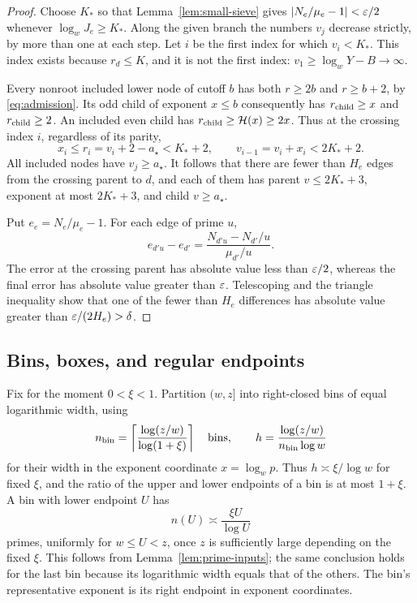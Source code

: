 \begin{proof}
Choose $K_*$ so that Lemma~\ref{lem:small-sieve} gives
$|N_e/\mu_e-1|<\varepsilon/2$ whenever $\log_w J_e\ge K_*$.  Along the
given branch the numbers $v_j$ decrease strictly, by more than one
at each step.  Let $i$ be the first index for which $v_i<K_*$.
This index exists because $r_d\le K$, and it is not the first index:
$v_1\ge\log_wY-B\to\infty$.

Every nonroot included lower node of cutoff $b$ has both $r\ge2b$
and $r\ge b+2$, by \eqref{eq:admission}.  Its odd child of exponent
$x\le b$ consequently has $r_{\rm child}\ge x$ and
$r_{\rm child}\ge2$.  An included even child has
$r_{\rm child}\ge \mathcal H(x)\ge2x$.  Thus at the crossing index $i$,
regardless of its parity,
\[
 x_i\le r_i=v_i+2-a_\star<K_*+2,
 \qquad v_{i-1}=v_i+x_i<2K_*+2.
\]
All included nodes have $v_j\ge a_\star$.  It follows that there are
fewer than $H_e$ edges from the crossing parent to $d$, and each of
them has parent $v\le2K_*+3$, exponent at most $2K_*+3$, and child
$v\ge a_\star$.

Put $e_e=N_e/\mu_e-1$.  For each edge of prime $u$,
\[
 e_{d'u}-e_{d'}
   =\frac{N_{d'u}-N_{d'}/u}{\mu_{d'}/u}.
\]
The error at the crossing parent has absolute value less than
$\varepsilon/2$, whereas the final error has absolute value greater than
$\varepsilon$.  Telescoping and the triangle inequality show that one of
the fewer than $H_e$ differences has absolute value greater than
$\varepsilon/(2H_e)>\delta$.
\end{proof}

\subsection{Bins, boxes, and regular endpoints}

Fix for the moment $0<\xi<1$.  Partition $(w,z]$ into right-closed
bins of equal logarithmic width, using
\[
 n_{\rm bin}=\left\lceil\frac{\log(z/w)}{\log(1+\xi)}\right\rceil
 \quad\text{bins},\qquad
 h=\frac{\log(z/w)}{n_{\rm bin}\log w}
\]
for their width in the exponent coordinate $x=\log_w p$.
Thus $h\asymp\xi/\log w$ for fixed $\xi$, and the ratio of the upper
and lower endpoints of a bin is at most $1+\xi$.  A bin with lower
endpoint $U$ has
\begin{equation}\label{eq:boxes-bin-count}
 n(U)\asymp\frac{\xi U}{\log U}
\end{equation}
primes, uniformly for $w\le U<z$, once $z$ is sufficiently large
depending on the fixed $\xi$.  This follows from
Lemma~\ref{lem:prime-inputs}; the same conclusion holds for the last
bin because its logarithmic width equals that of the others.
The bin's representative exponent is its right endpoint in exponent
coordinates.

